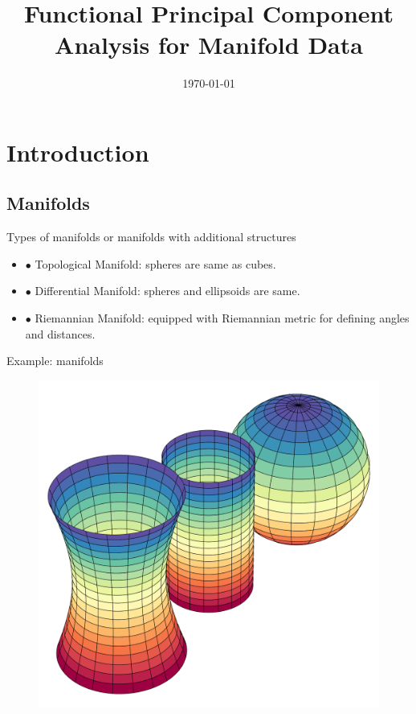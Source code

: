 \documentclass{beamer}
\title{Functional Principal Component Analysis for Manifold Data}
\date{\today}
\begin{document}
\maketitle
\section{Introduction}
\subsection{Manifolds}

\begin{frame}{Types of manifolds or manifolds with additional structures}
\begin{itemize}
  \item $\bullet$ Topological Manifold:  spheres are same as cubes.
  \item $\bullet$ Differential Manifold: spheres and ellipsoids are same.
  \item $\bullet$ Riemannian Manifold: equipped with Riemannian metric for defining angles and distances.
  \end{itemize}
\end{frame}


\begin{frame}{Example: manifolds}
\begin{figure}
\centering
\includegraphics[scale=0.2]{manifoldexample.png}
\end{figure}
\end{frame}
\end{document}
